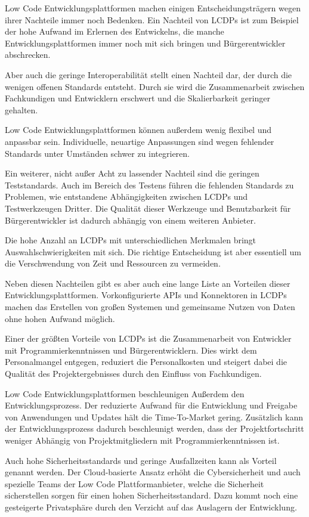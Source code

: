 \documentclass[12pt]{article} %
\begin{document}
	Low Code Entwicklungsplattformen machen einigen Entscheidungsträgern wegen ihrer Nachteile immer noch Bedenken. Ein Nachteil von LCDPs ist zum Beispiel der hohe Aufwand im Erlernen des Entwickelns, die manche Entwicklungsplattformen immer noch mit sich bringen und Bürgerentwickler abschrecken. 
	
	Aber auch die geringe Interoperabilität stellt einen Nachteil dar, der durch die wenigen offenen Standards entsteht. Durch sie wird die Zusammenarbeit zwischen Fachkundigen und Entwicklern erschwert und die Skalierbarkeit geringer gehalten. 
	
	Low Code Entwicklungsplattformen können außerdem wenig flexibel und anpassbar sein. Individuelle, neuartige Anpassungen sind wegen fehlender Standards unter Umständen schwer zu integrieren.
	
	Ein weiterer, nicht außer Acht zu lassender Nachteil sind die geringen Teststandards. Auch im Bereich des Testens führen die fehlenden Standards zu Problemen, wie entstandene Abhängigkeiten zwischen LCDPs und Testwerkzeugen Dritter. Die Qualität dieser Werkzeuge und Benutzbarkeit für Bürgerentwickler ist dadurch abhängig von einem weiteren Anbieter.  

	Die hohe Anzahl an LCDPs mit unterschiedlichen Merkmalen bringt Auswahlschwierigkeiten mit sich. Die richtige Entscheidung ist aber essentiell um die Verschwendung von Zeit und Ressourcen zu vermeiden. \newline
	
	Neben diesen Nachteilen gibt es aber auch eine lange Liste an Vorteilen dieser Entwicklungsplattformen. Vorkonfigurierte APIs und Konnektoren in LCDPs machen das Erstellen von großen Systemen und gemeinsame Nutzen von Daten ohne hohen Aufwand möglich. 
	
	Einer der größten Vorteile von LCDPs ist die Zusammenarbeit von Entwickler mit Programmierkenntnissen und Bürgerentwicklern. Dies wirkt dem Personalmangel entgegen, reduziert die Personalkosten und steigert dabei die Qualität des Projektergebnisses durch den Einfluss von Fachkundigen. 
	
	Low Code Entwicklungsplattformen beschleunigen Außerdem den Entwicklungsprozess. Der reduzierte Aufwand für die Entwicklung und Freigabe von Anwendungen und Updates hält die Time-To-Market gering. Zusätzlich kann der Entwicklungsprozess dadurch beschleunigt werden, dass der Projektfortschritt weniger Abhängig von Projektmitgliedern mit Programmierkenntnissen ist. 
	
	Auch hohe Sicherheitsstandards und geringe Ausfallzeiten kann als Vorteil genannt werden. Der Cloud-basierte Ansatz erhöht die Cybersicherheit und auch spezielle Teams der Low Code Plattformanbieter, welche die Sicherheit sicherstellen sorgen für einen hohen Sicherheitsstandard. Dazu kommt noch eine gesteigerte Privatsphäre durch den Verzicht auf das Auslagern der Entwicklung. 
	
\end{document}
